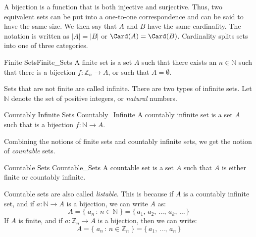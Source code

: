 \documentclass[crop=false,class=book,oneside]{standalone}
\begin{document}
            A bijection is a function that is both injective and
            surjective. Thus, two equivalent sets can be put
            into a one-to-one correspondence and can be said to
            have the same size. We then say that $A$ and $B$
            have the same cardinality. The notation is written
            as $|A|=|B|$ or $\Card(A)=\Card(B)$. Cardinality
            splits sets into one of three categories.
            \begin{ldefinition}{Finite Sets}{Finite_Sets}
                A finite set is a set $A$ such that there exists
                an $n\in\mathbb{N}$ such that there is a
                bijection $f:\mathbb{Z}_{n}\rightarrow{A}$, or
                such that $A=\emptyset$.
            \end{ldefinition}
            Sets that are not finite are called infinite. There
            are two types of infinite sets. Let $\mathbb{N}$
            denote the set of positive integers, or
            \textit{natural} numbers.
            \begin{ldefinition}{Countably Infinite Sets}
                  {Countably_Infinite}
                A countably infinite set is a set $A$ such that
                is a bijection $f:\mathbb{N}\rightarrow{A}$.
            \end{ldefinition}
            Combining the notions of finite sets and countably
            infinite sets, we get the notion of
            \textit{countable} sets.
            \begin{ldefinition}{Countable Sets}
                  {Countable_Sets}
                A countable set is a set $A$ such that $A$ is
                either finite or countably infinite.
            \end{ldefinition}
            Countable sets are also called \textit{listable}.
            This is because if $A$ is a countably infinite set,
            and if $a:\mathbb{N}\rightarrow{A}$ is a bijection,
            we can write $A$ as:
            \begin{equation}
                A=\{\;a_{n}\,:\,n\in\mathbb{N}\;\}
                =\{\,a_{1},\,a_{2},\,\dots,\,a_{k},\,\dots\,\}
            \end{equation}
            If $A$ is finite, and if
            $a:\mathbb{Z}_{n}\rightarrow{A}$ is a
            bijection, then we can write:
            \begin{equation}
                A=\{\;a_{n}\,:\,n\in\mathbb{Z}_{n}\;\}
                 =\{\,a_{1},\,\dots,\,a_{n}\,\}
            \end{equation}
\end{document}
